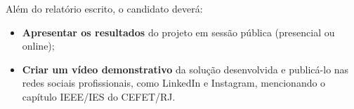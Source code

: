 \documentclass{ieeeojies}
\begin{document}
Além do relatório escrito, o candidato deverá:
\begin{itemize}
    \item \textbf{Apresentar os resultados} do projeto em sessão pública (presencial ou online);
    \item \textbf{Criar um vídeo demonstrativo} da solução desenvolvida e publicá-lo nas redes sociais profissionais, como LinkedIn e Instagram, mencionando o capítulo IEEE/IES do CEFET/RJ.
\end{itemize}





\end{document}
